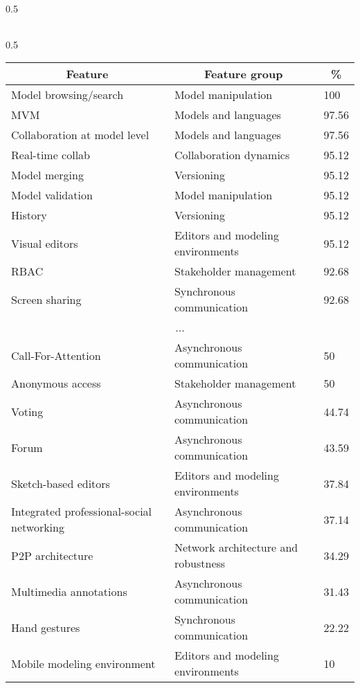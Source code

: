 \begin{table*}[]
\begin{subtable}[c]{0.5\textwidth}
\begin{tabular}{@{}lll@{}}
\bottomrule
  \end{tabular}%
  \end{subtable}
  \begin{subtable}[c]{0.5\textwidth}
  \centering
  \notsotiny
  \caption{Need.}
  \label{tab:top-bottom-need}
  \begin{tabular}{@{}lll@{}}
  \toprule
  \multicolumn{1}{c}{\textbf{Feature}} & \multicolumn{1}{c}{\textbf{Feature group}} & \multicolumn{1}{c}{\textbf{\%}} \\
  \midrule
  Model browsing/search & Model manipulation & 100 \\ 
MVM & Models and languages & 97.56 \\ 
Collaboration at model level & Models and languages & 97.56 \\ 
Real-time collab & Collaboration dynamics & 95.12 \\ 
Model merging & Versioning & 95.12 \\ 
Model validation & Model manipulation & 95.12 \\ 
History & Versioning & 95.12 \\ 
Visual editors & Editors and modeling environments & 95.12 \\ 
RBAC & Stakeholder management & 92.68 \\ 
Screen sharing & Synchronous communication & 92.68 \\ 
\multicolumn{3}{c}{...} \\ 
Call-For-Attention & Asynchronous communication & 50 \\ 
Anonymous access & Stakeholder management & 50 \\ 
Voting & Asynchronous communication & 44.74 \\ 
Forum & Asynchronous communication & 43.59 \\ 
Sketch-based editors & Editors and modeling environments & 37.84 \\ 
Integrated professional-social networking & Asynchronous communication & 37.14 \\ 
P2P architecture & Network architecture and robustness & 34.29 \\ 
Multimedia annotations & Asynchronous communication & 31.43 \\ 
Hand gestures & Synchronous communication & 22.22 \\ 
Mobile modeling environment & Editors and modeling environments & 10 \\ 
\bottomrule
  \end{tabular}
  \end{subtable}
  \end{table*}